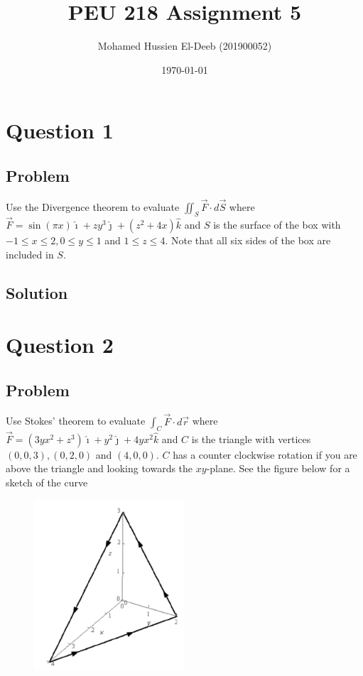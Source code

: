 \documentclass[12pt]{article}
\title{PEU 218 Assignment 5}
\author{Mohamed Hussien El-Deeb (201900052)}
\date{\today}
\begin{document}
\maketitle
\tableofcontents
\hypersetup{linkcolor=RoyalBlue4}

\newpage
\section{Question 1}

\subsection{Problem}

Use the Divergence theorem to evaluate \(\iint_S \vec{F} \cdot d \vec{S}\) where \(\vec{F}=\sin (\pi x) \hat{\imath}+z y^3 \hat{\jmath}+\left(z^2+4 x\right) \hat{k}\) and \(S\) is the surface of the box with \(-1 \leq x \leq 2,0 \leq y \leq 1\) and \(1 \leq z \leq 4\). Note that all six sides of the box are included in \(S\).

\subsection{Solution}

\newpage
\section{Question 2}

\subsection{Problem}

Use Stokes' theorem to evaluate \(\int_C \vec{F} \cdot d \vec{r}\) where \(\vec{F}=\left(3 y x^2+z^3\right) \hat{\imath}+y^2 \hat{\jmath}+4 y x^2 \hat{k}\) and \(C\) is the triangle with vertices \((0,0,3),(0,2,0)\) and \((4,0,0)\). \(C\) has a counter clockwise rotation if you are above the triangle and looking towards the \(x y\)-plane. See the figure below for a sketch of the curve

\begin{figure}[H]
    \centering
    \includegraphics[width=0.5\textwidth]{Q2.png}
\end{figure}
\end{document}
